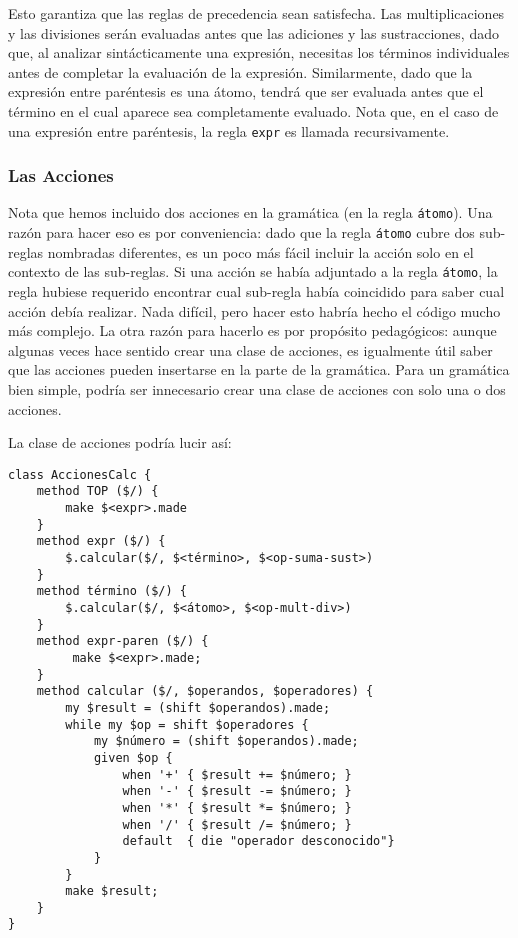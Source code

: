 Esto garantiza que las reglas de precedencia sean satisfecha.
Las multiplicaciones y las divisiones serán evaluadas antes que 
las adiciones y las sustracciones, dado que, al analizar sintácticamente
una expresión, necesitas los términos individuales antes de completar 
la evaluación de la expresión. Similarmente, dado que la expresión
entre paréntesis es una átomo, tendrá que ser evaluada antes que el término
en el cual aparece sea completamente evaluado. Nota que, en el caso 
de una expresión entre paréntesis, la regla \verb|expr| es llamada
recursivamente.

\subsubsection{Las Acciones}

Nota que hemos incluido dos acciones en la gramática (en la
regla {\tt átomo}). Una razón para hacer eso es por conveniencia:
dado que la regla {\tt átomo} cubre dos sub-reglas nombradas
diferentes, es un poco más fácil incluir la acción solo en el 
contexto de las sub-reglas. Si una acción se había adjuntado a
la regla {\tt átomo}, la regla hubiese requerido encontrar cual sub-regla
había coincidido para saber cual acción debía realizar. 
Nada difícil, pero hacer esto habría hecho el código mucho más complejo.
La otra razón para hacerlo es por propósito pedagógicos: aunque algunas
veces hace sentido crear una clase de acciones, es igualmente útil 
saber que las acciones pueden insertarse en la parte de la gramática.
Para un gramática bien simple, podría ser innecesario crear una clase 
de acciones con solo una o dos acciones.

La clase de acciones podría lucir así:

\begin{verbatim}
class AccionesCalc {
    method TOP ($/) {
        make $<expr>.made
    }
    method expr ($/) {
        $.calcular($/, $<término>, $<op-suma-sust>)
    }
    method término ($/) {
        $.calcular($/, $<átomo>, $<op-mult-div>)
    }
    method expr-paren ($/) {
         make $<expr>.made;
    }
    method calcular ($/, $operandos, $operadores) {
        my $result = (shift $operandos).made;
        while my $op = shift $operadores {
            my $número = (shift $operandos).made;
            given $op {
                when '+' { $result += $número; }
                when '-' { $result -= $número; }
                when '*' { $result *= $número; }
                when '/' { $result /= $número; }
                default  { die "operador desconocido"}
            }
        }
        make $result;
    }
}
\end{verbatim}

